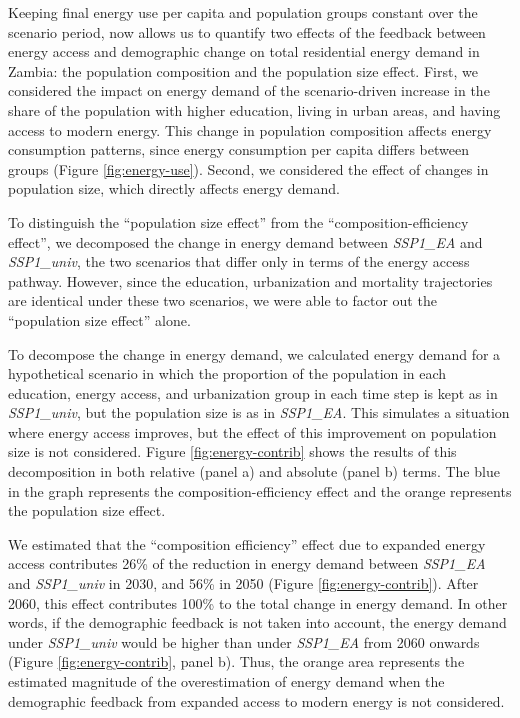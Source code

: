 \documentclass[
]{article}
\begin{document}
Keeping final energy use per capita and population groups constant over the scenario period, now allows us to quantify two effects of the feedback between energy access and demographic change on total residential energy demand in Zambia: the population composition and the population size effect. First, we considered the impact on energy demand of the scenario-driven increase in the share of the population with higher education, living in urban areas, and having access to modern energy. This change in population composition affects energy consumption patterns, since energy consumption per capita differs between groups (Figure \ref{fig:energy-use}). Second, we considered the effect of changes in population size, which directly affects energy demand.

To distinguish the ``population size effect'' from the ``composition-efficiency effect'', we decomposed the change in energy demand between \emph{SSP1\_EA} and \emph{SSP1\_univ}, the two scenarios that differ only in terms of the energy access pathway. However, since the education, urbanization and mortality trajectories are identical under these two scenarios, we were able to factor out the ``population size effect'' alone.

To decompose the change in energy demand, we calculated energy demand for a hypothetical scenario in which the proportion of the population in each education, energy access, and urbanization group in each time step is kept as in \emph{SSP1\_univ}, but the population size is as in \emph{SSP1\_EA}. This simulates a situation where energy access improves, but the effect of this improvement on population size is not considered. Figure \ref{fig:energy-contrib} shows the results of this decomposition in both relative (panel a) and absolute (panel b) terms. The blue in the graph represents the composition-efficiency effect and the orange represents the population size effect.

We estimated that the ``composition efficiency'' effect due to expanded energy access contributes 26\% of the reduction in energy demand between \emph{SSP1\_EA} and \emph{SSP1\_univ} in 2030, and 56\% in 2050 (Figure \ref{fig:energy-contrib}). After 2060, this effect contributes 100\% to the total change in energy demand. In other words, if the demographic feedback is not taken into account, the energy demand under \emph{SSP1\_univ} would be higher than under \emph{SSP1\_EA} from 2060 onwards (Figure \ref{fig:energy-contrib}, panel b). Thus, the orange area represents the estimated magnitude of the overestimation of energy demand when the demographic feedback from expanded access to modern energy is not considered.
\end{document}
